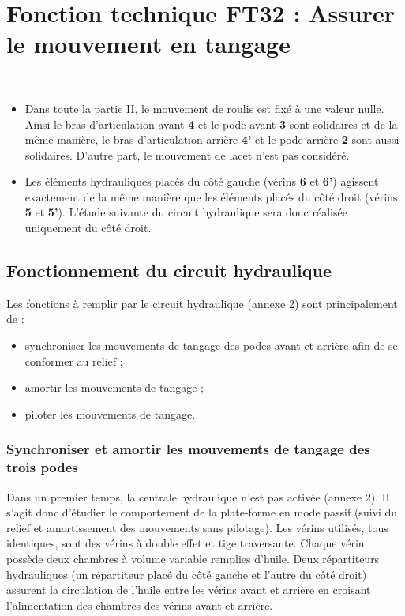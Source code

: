 \section{Fonction technique FT32 : Assurer le mouvement en tangage \label{sec:2}}

\begin{hypo}~\\
\begin{itemize}
\item Dans toute la partie II, le mouvement de roulis est fixé à une valeur nulle. Ainsi le bras d’articulation avant \textbf{4} et
le pode avant \textbf{3} sont solidaires et de la même manière, le bras d’articulation arrière \textbf{4’} et le pode arrière \textbf{2} sont
aussi solidaires. D’autre part, le mouvement de lacet n’est pas considéré.
\item Les éléments hydrauliques placés du côté gauche (vérins \textbf{6} et \textbf{6’}) agissent exactement de la même manière
que les éléments placés du côté droit (vérins \textbf{5} et \textbf{5’}). L’étude suivante du circuit hydraulique sera donc
réalisée uniquement du côté droit.
\end{itemize}
\end{hypo}

\subsection{Fonctionnement du circuit hydraulique}

Les fonctions à remplir par le circuit hydraulique (annexe 2) sont principalement de :
\begin{itemize}
\item synchroniser les mouvements de tangage des podes avant et arrière afin de se conformer au relief ;
\item amortir les mouvements de tangage ;
\item piloter les mouvements de tangage.
\end{itemize}

\subsubsection{Synchroniser et amortir les mouvements de tangage des trois podes}

Dans un premier temps, la centrale hydraulique n’est pas activée (annexe 2). Il s’agit donc d’étudier le comportement
de la plate-forme en mode passif (suivi du relief et amortissement des mouvements sans pilotage).
Les vérins utilisés, tous identiques, sont des vérins à double effet et tige traversante. Chaque vérin possède deux
chambres à volume variable remplies d’huile. Deux répartiteurs hydrauliques (un répartiteur placé du côté gauche et
l’autre du côté droit) assurent la circulation de l’huile entre les vérins avant et arrière en croisant l’alimentation des
chambres des vérins avant et arrière.

